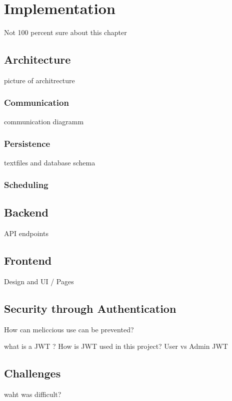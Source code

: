 \chapter{Implementation}
\label{ch:implementation}
Not 100 percent sure about this chapter

\section{Architecture}
\label{sec:implementation:architecture}
picture of architrecture
\subsection{Communication}
\label{subsec:implementation:architecture:communication}
communication diagramm
\subsection{Persistence}
\label{subsec:implementation:architecture:persistence}
textfiles and database schema
\subsection{Scheduling}
\label{subsec:implementation:architecture:scheduling}


\section{Backend}
\label{sec:implementation:backend}
API endpoints 

\section{Frontend}
\label{sec:implementation:frontend}
Design and UI / Pages

\section{Security through Authentication}
\label{sec:implementation:authentication}
How can meliccious use can be prevented?

what is a JWT ? How is JWT used in this project? User vs Admin JWT

\section{Challenges}
\label{sec:implementation:challenges}
waht was difficult?